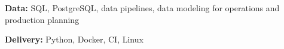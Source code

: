 \item \textbf{Data:} SQL, PostgreSQL, data pipelines, data modeling for operations and production planning
\item \textbf{Delivery:} Python, Docker, CI, Linux
